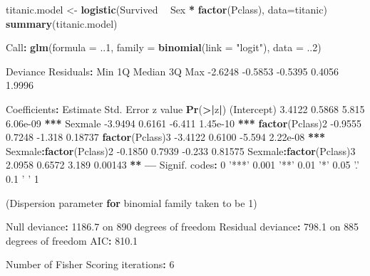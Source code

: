 \documentclass[]{article}
\newenvironment{Shaded}{\begin{snugshade}}{\end{snugshade}}
\newcommand{\ControlFlowTok}[1]{\textcolor[rgb]{0.13,0.29,0.53}{\textbf{#1}}}
\newcommand{\DataTypeTok}[1]{\textcolor[rgb]{0.13,0.29,0.53}{#1}}
\newcommand{\DecValTok}[1]{\textcolor[rgb]{0.00,0.00,0.81}{#1}}
\newcommand{\ErrorTok}[1]{\textcolor[rgb]{0.64,0.00,0.00}{\textbf{#1}}}
\newcommand{\FloatTok}[1]{\textcolor[rgb]{0.00,0.00,0.81}{#1}}
\newcommand{\KeywordTok}[1]{\textcolor[rgb]{0.13,0.29,0.53}{\textbf{#1}}}
\newcommand{\NormalTok}[1]{#1}
\newcommand{\OperatorTok}[1]{\textcolor[rgb]{0.81,0.36,0.00}{\textbf{#1}}}
\newcommand{\StringTok}[1]{\textcolor[rgb]{0.31,0.60,0.02}{#1}}
\begin{document}
\begin{Shaded}
\begin{Highlighting}[]
\NormalTok{titanic.model <-}\StringTok{ }\KeywordTok{logistic}\NormalTok{(Survived }\OperatorTok{~}\StringTok{ }\NormalTok{Sex }\OperatorTok{*}\StringTok{ }\KeywordTok{factor}\NormalTok{(Pclass), }\DataTypeTok{data=}\NormalTok{titanic)}
\KeywordTok{summary}\NormalTok{(titanic.model)}

\NormalTok{Call}\OperatorTok{:}
\KeywordTok{glm}\NormalTok{(}\DataTypeTok{formula =}\NormalTok{ ..}\DecValTok{1}\NormalTok{, }\DataTypeTok{family =} \KeywordTok{binomial}\NormalTok{(}\DataTypeTok{link =} \StringTok{"logit"}\NormalTok{), }\DataTypeTok{data =}\NormalTok{ ..}\DecValTok{2}\NormalTok{)}

\NormalTok{Deviance Residuals}\OperatorTok{:}\StringTok{ }
\StringTok{    }\NormalTok{Min       1Q   Median       3Q      Max  }
\FloatTok{-2.6248}  \FloatTok{-0.5853}  \FloatTok{-0.5395}   \FloatTok{0.4056}   \FloatTok{1.9996}  

\NormalTok{Coefficients}\OperatorTok{:}
\StringTok{                        }\NormalTok{Estimate Std. Error z value }\KeywordTok{Pr}\NormalTok{(}\OperatorTok{>}\ErrorTok{|}\NormalTok{z}\OperatorTok{|}\NormalTok{)    }
\NormalTok{(Intercept)               }\FloatTok{3.4122}     \FloatTok{0.5868}   \FloatTok{5.815} \FloatTok{6.06e-09} \OperatorTok{**}\ErrorTok{*}
\NormalTok{Sexmale                  }\FloatTok{-3.9494}     \FloatTok{0.6161}  \FloatTok{-6.411} \FloatTok{1.45e-10} \OperatorTok{**}\ErrorTok{*}
\KeywordTok{factor}\NormalTok{(Pclass)}\DecValTok{2}          \FloatTok{-0.9555}     \FloatTok{0.7248}  \FloatTok{-1.318}  \FloatTok{0.18737}    
\KeywordTok{factor}\NormalTok{(Pclass)}\DecValTok{3}          \FloatTok{-3.4122}     \FloatTok{0.6100}  \FloatTok{-5.594} \FloatTok{2.22e-08} \OperatorTok{**}\ErrorTok{*}
\NormalTok{Sexmale}\OperatorTok{:}\KeywordTok{factor}\NormalTok{(Pclass)}\DecValTok{2}  \FloatTok{-0.1850}     \FloatTok{0.7939}  \FloatTok{-0.233}  \FloatTok{0.81575}    
\NormalTok{Sexmale}\OperatorTok{:}\KeywordTok{factor}\NormalTok{(Pclass)}\DecValTok{3}   \FloatTok{2.0958}     \FloatTok{0.6572}   \FloatTok{3.189}  \FloatTok{0.00143} \OperatorTok{**}\StringTok{ }
\OperatorTok{---}
\NormalTok{Signif. codes}\OperatorTok{:}\StringTok{  }\DecValTok{0} \StringTok{'***'} \FloatTok{0.001} \StringTok{'**'} \FloatTok{0.01} \StringTok{'*'} \FloatTok{0.05} \StringTok{'.'} \FloatTok{0.1} \StringTok{' '} \DecValTok{1}

\NormalTok{(Dispersion parameter }\ControlFlowTok{for}\NormalTok{ binomial family taken to be }\DecValTok{1}\NormalTok{)}

\NormalTok{    Null deviance}\OperatorTok{:}\StringTok{ }\FloatTok{1186.7}\NormalTok{  on }\DecValTok{890}\NormalTok{  degrees of freedom}
\NormalTok{Residual deviance}\OperatorTok{:}\StringTok{  }\FloatTok{798.1}\NormalTok{  on }\DecValTok{885}\NormalTok{  degrees of freedom}
\NormalTok{AIC}\OperatorTok{:}\StringTok{ }\FloatTok{810.1}

\NormalTok{Number of Fisher Scoring iterations}\OperatorTok{:}\StringTok{ }\DecValTok{6}
\end{Highlighting}
\end{Shaded}
\end{document}
